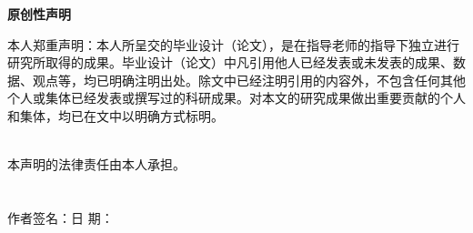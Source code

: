 
\centerline{\erhao{}\textbf{原创性声明}}
\label{original}
\thispagestyle{headFancy}
\vspace*{18pt}
\linespread{1.25}
\song\xiaosan

本人郑重声明：本人所呈交的毕业设计（论文），是在指导老师的指导下独立进行研究所取得的成果。毕业设计（论文）中凡引用他人已经发表或未发表的成果、数据、观点等，均已明确注明出处。除文中已经注明引用的内容外，不包含任何其他个人或集体已经发表或撰写过的科研成果。对本文的研究成果做出重要贡献的个人和集体，均已在文中以明确方式标明。

~\\
\noindent 本声明的法律责任由本人承担。\\
~\\
~\\
作者签名：\hspace{5cm}日  期：

